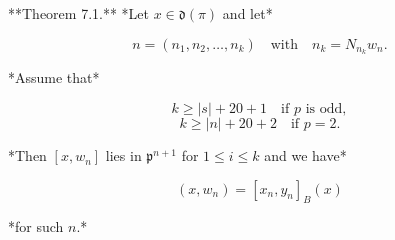 **Theorem 7.1.** *Let $x \in \mathfrak{d}(\pi)$ and let*

$$n = (n_1, n_2, \dots, n_k) \quad\text{with}\quad n_k = N_{n_k} w_n.$$

*Assume that*

$$
k \ge |s| + 20 + 1 \quad \text{if $p$ is odd},
$$
$$
k \ge |n| + 20 + 2 \quad \text{if $p = 2$}.
$$

*Then $[x, w_n]$ lies in $\mathfrak{p}^{n+1}$ for $1 \le i \le k$ and we have*

$$(x, w_n) = [x_n, y_n]_B(x)$$

*for such $n$.*
